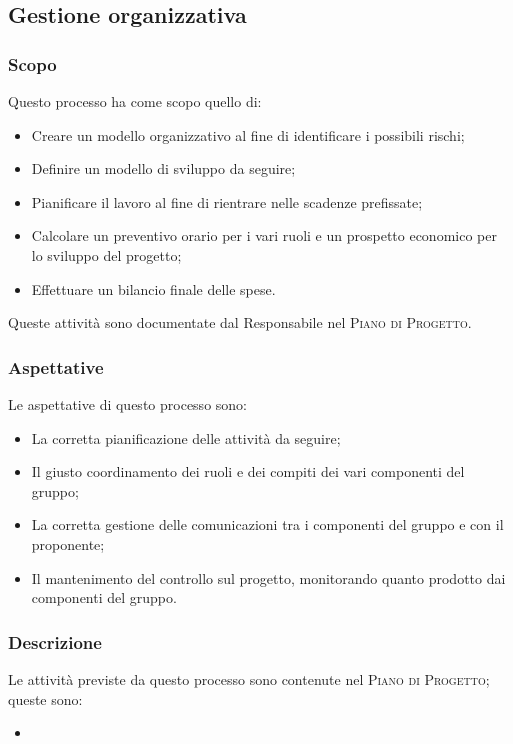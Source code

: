 \documentclass[../norme-di-progetto.tex]{subfiles}
\begin{document}
\subsection{Gestione organizzativa}
\subsubsection{Scopo}
Questo processo ha come scopo quello di:
\begin{itemize}
  \item Creare un modello organizzativo al fine di identificare i possibili rischi;
  \item Definire un modello di sviluppo da seguire;
  \item Pianificare il lavoro al fine di rientrare nelle scadenze prefissate;
  \item Calcolare un preventivo orario per i vari ruoli e un prospetto economico per lo sviluppo del progetto;
  \item Effettuare un bilancio finale delle spese.
\end{itemize}
Queste attività sono documentate dal Responsabile nel \textsc{Piano di Progetto}.

\subsubsection{Aspettative}
Le aspettative di questo processo sono:
\begin{itemize}
  \item La corretta pianificazione delle attività da seguire;
  \item Il giusto coordinamento dei ruoli e dei compiti dei vari componenti del gruppo;
  \item La corretta gestione delle comunicazioni tra i componenti del gruppo e con il proponente;
  \item Il mantenimento del controllo sul progetto, monitorando quanto prodotto dai componenti del gruppo.
\end{itemize}

\subsubsection{Descrizione}
Le attività previste da questo processo sono contenute nel \textsc{Piano di Progetto}; queste sono:
\begin{itemize}
  \item %
\end{itemize}
\end{document}
